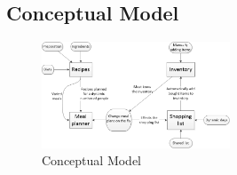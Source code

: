 \subsection{Conceptual Model}

\begin{figure}[H]
	\centering
    \includegraphics[width=0.5\textwidth]{Grafik/conceptualModel}
	\caption{Conceptual Model}
	\label{ConceptualModelPicture}
\end{figure}

